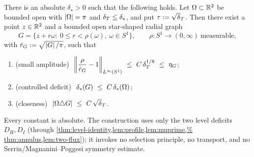 \begin{theorem}\label{thm:reduction}
There is an absolute $\delta_\star>0$ such that the following holds. Let
$\Omega\subset\mathbb{R}^2$ be bounded open with $\left\lvert\Omega\right\rvert=\pi$ and $\delta_T\le\delta_\star$,
and put
$\tau:=\sqrt\dT$. Then there exist a point $z\in\mathbb{R}^2$ and a bounded open
star-shaped radial graph
\[
   G=\{z+r\omega:\ 0\le r<\rho(\omega),\ \omega\in S^1\},
   \qquad \rho\colon S^1\to(0,\infty)\ \text{measurable},
\]
with $\hat r_G:=\sqrt{\left\lvert G\right\rvert/\pi}$, such that
\begin{enumerate}[label=\textup{(\roman*)},leftmargin=2.6em]
\item \textup{(small amplitude)}
   $\ \norm{\dfrac{\rho}{\hat r_G}-1}_{L^\infty(S^1)}\ \le\ C\,\dT^{1/8}
   \ \le\ \eta_G$;
\item \textup{(controlled deficit)} $\ \delta_{*}(G)\ \le\ C\,\delta_{*}(\Omega)$;
\item \textup{(closeness)} $\ \abs{\Om\triangle G}\ \le\ C\,\sqrt\dT$.
\end{enumerate}
Every constant is absolute. The construction uses only the two level
deficits $D_H,D_I$ (through \cref{thm:level-identity,lem:profile,lem:muprime,%
thm:annulus,lem:two-flux}); it invokes no selection principle, no transport,
and no Serrin/Magnanini--Poggesi symmetry estimate.
\end{theorem}

